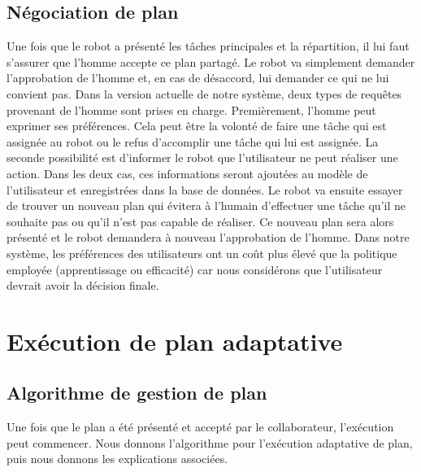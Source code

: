 \documentclass[a4paper,11pt,twoside]{StyleThese}
\begin{document}
\subsection{Négociation de plan}
\label{sec:planNego}
Une fois que le robot a présenté les tâches principales et la répartition, il lui faut s'assurer que l'homme accepte ce plan partagé. Le robot va simplement demander l'approbation de l'homme et, en cas de désaccord, lui demander ce qui ne lui convient pas.
Dans la version actuelle de notre système, deux types de requêtes provenant de l'homme sont prises en charge. Premièrement, l'homme peut exprimer ses préférences. Cela peut être la volonté de faire une tâche qui est assignée au robot ou le refus d'accomplir une tâche qui lui est assignée. La seconde possibilité est d'informer le robot que l'utilisateur ne peut réaliser une action. Dans les deux cas, ces informations seront ajoutées au modèle de l'utilisateur et enregistrées dans la base de données. Le robot va ensuite essayer de trouver un nouveau plan qui évitera à l'humain d'effectuer une tâche qu'il ne souhaite pas ou qu'il n'est pas capable de réaliser. Ce nouveau plan sera alors présenté et le robot demandera à nouveau l'approbation de l'homme. Dans notre système, les préférences des utilisateurs ont un coût plus élevé que la politique employée (apprentissage ou efficacité) car nous considérons que l'utilisateur devrait avoir la décision finale.


\section{Exécution de plan adaptative}
\label{planExecution}

\subsection{Algorithme de gestion de plan}
\label{sec:algo}
Une fois que le plan a été présenté et accepté par le collaborateur, l'exécution peut commencer. Nous donnons l'algorithme pour l'exécution adaptative de plan, puis nous donnons les explications associées.
\end{document}
